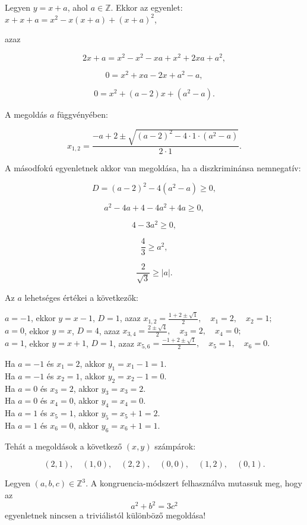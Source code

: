 \begin{solution}
Legyen $y=x+a$, ahol $a\in\mathbb{Z}$. Ekkor az egyenlet: $x+x+a=x^{2}-x(x+a)+(x+a)^{2}$,

azaz

\[
2x+a=x^{2}-x^{2}-xa+x^{2}+2xa+a^{2},
\]

\[
0=x^{2}+xa-2x+a^{2}-a,
\]

\[
0=x^{2}+(a-2)x+\left(a^{2}-a\right).
\]

A megoldás $a$ függvényében:

\[
x_{1,2}=\frac{-a+2\pm\sqrt{(a-2)^{2}-4\cdot1\cdot(a^{2}-a)}}{2\cdot1}.
\]

A másodfokú egyenletnek akkor van megoldása, ha a diszkriminánsa nemnegatív:

\[
D=(a-2)^{2}-4(a^{2}-a)\geq0,
\]

\[
a^{2}-4a+4-4a^{2}+4a\geq0,
\]

\[
4-3a^{2}\geq0,
\]

\[
\frac{4}{3}\geq a^{2},
\]

\[
\frac{2}{\sqrt{3}}\geq|a|.
\]

Az $a$ lehetséges értékei a következők:

$a=-1$, ekkor $y=x-1$, $D=1$, azaz $x_{1,2}=\frac{1+2\pm\sqrt{1}}{2},\quad x_{1}=2,\quad x_{2}=1;$\\

$a=0$, ekkor $y=x$, $D=4$, azaz $x_{3,4}=\frac{2\pm\sqrt{4}}{2},\quad x_{3}=2,\quad x_{4}=0;$\\

$a=1$, ekkor $y=x+1$, $D=1$, azaz $x_{5,6}=\frac{-1+2\pm\sqrt{1}}{2},\quad x_{5}=1,\quad x_{6}=0.$

\medskip{}

Ha $a=-1$ és $x_{1}=2$, akkor $y_{1}=x_{1}-1=1$.\\
 Ha $a=-1$ és $x_{2}=1$, akkor $y_{2}=x_{2}-1=0$. \\
 Ha $a=0$ és $x_{3}=2$, akkor $y_{3}=x_{3}=2$.\\
 Ha $a=0$ és $x_{4}=0$, akkor $y_{4}=x_{4}=0$. \\
 Ha $a=1$ és $x_{5}=1$, akkor $y_{5}=x_{5}+1=2$.\\
 Ha $a=1$ és $x_{6}=0$, akkor $y_{6}=x_{6}+1=1$.

\medskip{}

Tehát a megoldások a következő $(x,y)$ számpárok:

\[
(2,1),\quad(1,0),\quad(2,2),\quad(0,0),\quad(1,2),\quad(0,1).
\]
\end{solution}
\begin{extraproblem}
Legyen $(a,b,c)\in\mathbb{Z}^{3}$. A kongruencia-módszert felhasználva
mutassuk meg, hogy az 
\[
a^{2}+b^{2}=3c^{2}
\]
egyenletnek nincsen a triviálistól különböző megoldása! 
\end{extraproblem}

